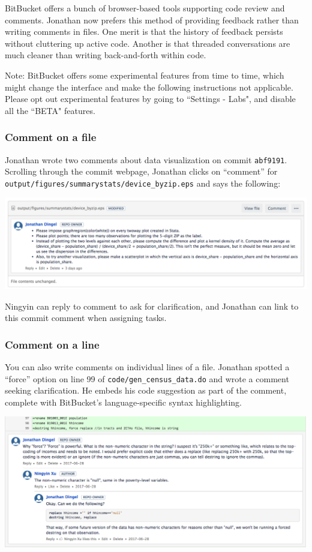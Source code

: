 BitBucket offers a bunch of browser-based tools supporting code review and comments. 
Jonathan now prefers this method of providing feedback rather than writing comments in files.
One merit is that the history of feedback persists without cluttering up active code.
Another is that threaded conversations are much cleaner than writing back-and-forth within code.

Note: BitBucket offers some experimental features from time to time, 
which might change the interface and make the following instructions not applicable. 
Please opt out experimental features by going to ``Settings - Labs", 
and disable all the ``BETA" features.

\subsubsection{Comment on a file}
Jonathan wrote two comments about data visualization on commit \texttt{abf9191}.
Scrolling through the commit webpage, Jonathan clicks on ``comment'' for \texttt{output/figures/summarystats/device\_byzip.eps} and says the following:
\begin{center}\includegraphics[width=.8\textwidth]{./figures/workflow/BitBucket_screenshot_commenting1.png}\end{center}
Ningyin can reply to comment to ask for clarification, and Jonathan can link to this commit comment when assigning tasks.

\subsubsection{Comment on a line}
You can also write comments on individual lines of a file.
Jonathan spotted a ``force'' option on line 99 of \texttt{code/gen\_census\_data.do} and wrote a comment seeking clarification.
He embeds his code suggestion as part of the comment, complete with BitBucket's language-specific syntax highlighting.
\begin{center}\includegraphics[width=\textwidth]{./figures/workflow/BitBucket_screenshot_commenting2.png}\end{center}

